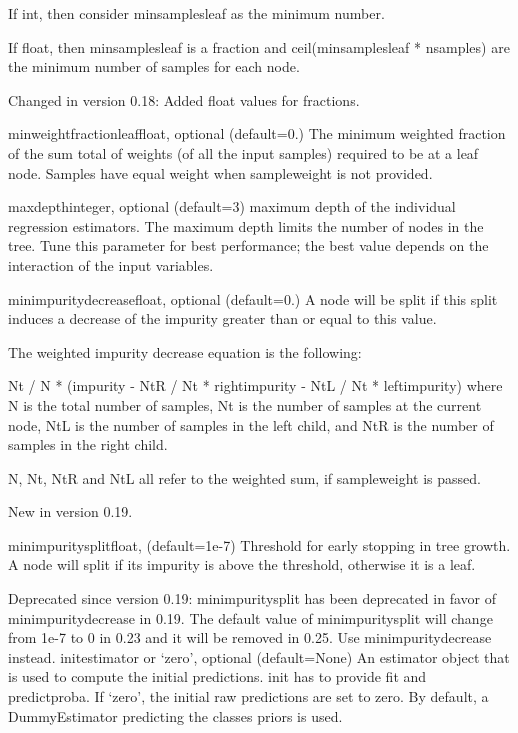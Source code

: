 \documentclass[12pt]{article}
\begin{document}
\begin{itemize}
If int, then consider min\textunderscore samples\textunderscore leaf as the minimum number.

If float, then min\textunderscore samples\textunderscore leaf is a fraction and ceil(min\textunderscore samples\textunderscore leaf * n\textunderscore samples) are the minimum number of samples for each node.

Changed in version 0.18: Added float values for fractions.

min\textunderscore weight\textunderscore fraction\textunderscore leaffloat, optional (default=0.)
The minimum weighted fraction of the sum total of weights (of all the input samples) required to be at a leaf node. Samples have equal weight when sample\textunderscore weight is not provided.

max\textunderscore depthinteger, optional (default=3)
maximum depth of the individual regression estimators. The maximum depth limits the number of nodes in the tree. Tune this parameter for best performance; the best value depends on the interaction of the input variables.

min\textunderscore impurity\textunderscore decreasefloat, optional (default=0.)
A node will be split if this split induces a decrease of the impurity greater than or equal to this value.

The weighted impurity decrease equation is the following:

N\textunderscore t / N * (impurity - N\textunderscore t\textunderscore R / N\textunderscore t * right\textunderscore impurity
                    - N\textunderscore t\textunderscore L / N\textunderscore t * left\textunderscore impurity)
where N is the total number of samples, N\textunderscore t is the number of samples at the current node, N\textunderscore t\textunderscore L is the number of samples in the left child, and N\textunderscore t\textunderscore R is the number of samples in the right child.

N, N\textunderscore t, N\textunderscore t\textunderscore R and N\textunderscore t\textunderscore L all refer to the weighted sum, if sample\textunderscore weight is passed.

New in version 0.19.

min\textunderscore impurity\textunderscore splitfloat, (default=1e-7)
Threshold for early stopping in tree growth. A node will split if its impurity is above the threshold, otherwise it is a leaf.

Deprecated since version 0.19: min\textunderscore impurity\textunderscore split has been deprecated in favor of min\textunderscore impurity\textunderscore decrease in 0.19. The default value of min\textunderscore impurity\textunderscore split will change from 1e-7 to 0 in 0.23 and it will be removed in 0.25. Use min\textunderscore impurity\textunderscore decrease instead.
initestimator or ‘zero’, optional (default=None)
An estimator object that is used to compute the initial predictions. init has to provide fit and predict\textunderscore proba. If ‘zero’, the initial raw predictions are set to zero. By default, a DummyEstimator predicting the classes priors is used.


\end{itemize}
\end{document}

